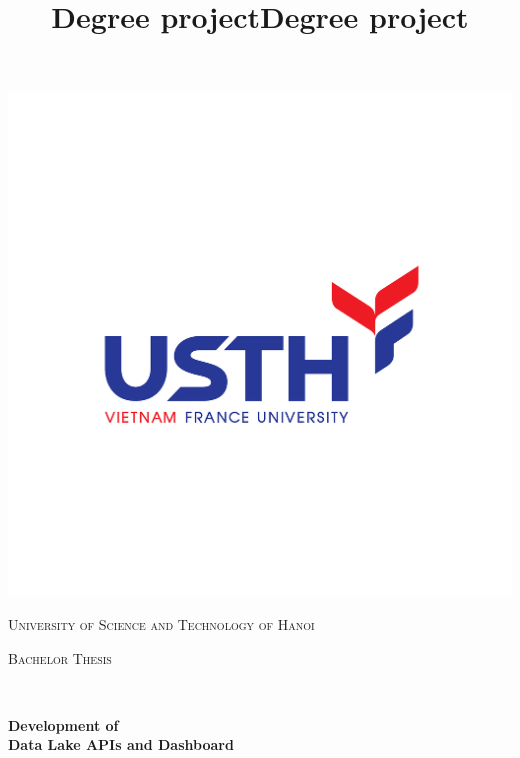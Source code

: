 \documentclass[12pt, twoside]{book}
\title{Degree project}
\title{Degree project}
\begin{document}
\linespread{1.25}

\thispagestyle{firststyle}
\begin{center}
  \begin{minipage}{0.48\textwidth} 
    \begin{center}
        \includegraphics[scale = 0.2]{images/usth_logo.png}
    \end{center}
  \end{minipage}
  \vspace*{-3cm}

  \vspace*{1cm}

  \textsc{\Large University of Science and Technology of Hanoi}\\[1.5cm]

  \begin{minipage}{0.9\textwidth} 
    \begin{center}
      \textsc{\LARGE Bachelor Thesis}
    \end{center}
  \end{minipage}\\[0.5cm]
  
  \vspace*{1cm}

  { \huge \bfseries Development of \\ Data Lake APIs and Dashboard}\\[0.4cm]	


\end{center}
\end{document}
